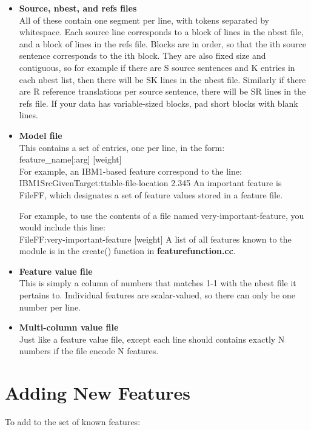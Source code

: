\documentclass[12pt]{amsart}
\newcommand{\file}{\textbf} \newcommand{\url}{\underline}
\begin{document}
\begin{itemize}

\item \textbf{Source, nbest, and refs files}\\
  All of these contain one segment per line, with tokens separated by
  whitespace.  Each source line corresponds to a block of lines in the nbest
  file, and a block of lines in the refs file.  Blocks are in order, so that
  the ith source sentence corresponds to the ith block.  They are also fixed
  size and contiguous, so for example if there are S source sentences and K
  entries in each nbest list, then there will be SK lines in the nbest file.
  Similarly if there are R reference translations per source sentence, there
  will be SR lines in the refs file.  If your data has variable-sized blocks,
  pad short blocks with blank lines.

\item \textbf{Model file}\\
  This contains a set of entries, one per line, in the form:\\
  feature\_name[:arg] [weight]\\ For example, an IBM1-based feature correspond
  to the line:\\ IBM1SrcGivenTarget:ttable-file-location 2.345 An important
  feature is FileFF, which designates a set of feature values stored in a
  feature file.

  For example, to use the contents of a file named very-important-feature, you
  would include this line:\\ FileFF:very-important-feature [weight] A list of
  all features known to the module is in the create() function in
  \file{featurefunction.cc}.

\item \textbf{Feature value file}\\
  This is simply a column of numbers that matches 1-1 with the nbest file it
  pertains to.  Individual features are scalar-valued, so there can only be one
  number per line.

\item \textbf{Multi-column value file}\\
  Just like a feature value file, except each line should contains exactly N
  numbers if the file encode N features.

\end{itemize}

\section*{Adding New Features}
To add to the set of known features:
\end{document}
